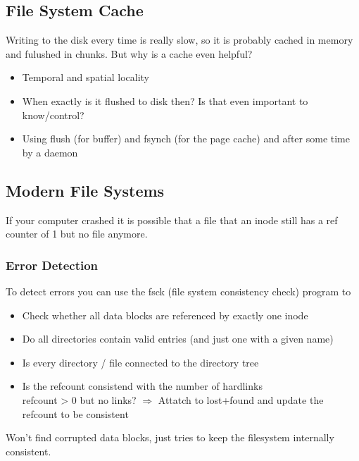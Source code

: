 \documentclass{kit}
\begin{document}
  \subsection{File System Cache}
    Writing to the disk every time is really slow, so it is probably cached in memory and fulushed in chunks. But why is
    a cache even helpful?
    \begin{itemize}
      \item Temporal and spatial locality
      \item When exactly is it flushed to disk then? Is that even important to know/control?
      \item Using flush (for buffer) and fsynch (for the page cache) and after some time by a daemon
    \end{itemize}
  \subsection{Modern File Systems}
    If your computer crashed it is possible that a file that an inode still has a ref counter of 1 but no file anymore.
    \subsubsection{Error Detection}
      To detect errors you can use the fsck (file system consistency check) program to
      \begin{itemize}
        \item Check whether all data blocks are referenced by exactly one inode
        \item Do all directories contain valid entries (and just one with a given name)
        \item Is every directory / file connected to the directory tree
        \item Is the refcount consistend with the number of hardlinks\\
          refcount > 0 but no links? $\Rightarrow$ Attatch to lost+found and update the refcount to be consistent
      \end{itemize}
      Won't find corrupted data blocks, just tries to keep the filesystem internally consistent.
\end{document}
